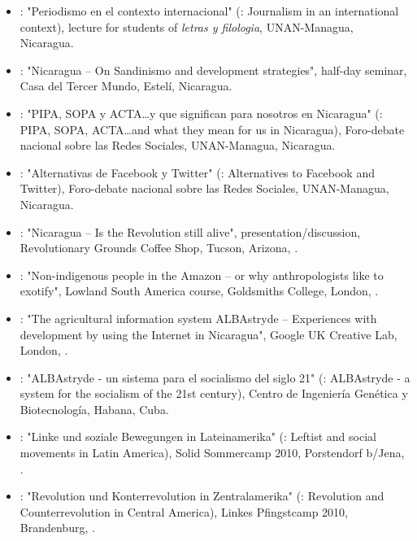 \begin{itemize}
\item {}: "Periodismo en el contexto internacional" (\english: Journalism in an international context), lecture for students of \emph{letras y filologia}, UNAN-Managua, Nicaragua.

\item {}: "Nicaragua – On Sandinismo and development strategies", half-day seminar, Casa del Tercer Mundo, Estelí, Nicaragua.

\item {}: "PIPA, SOPA y ACTA\ldots y que significan para nosotros en Nicaragua" (\english: PIPA, SOPA, ACTA\ldots and what they mean for us in Nicaragua), Foro-debate nacional sobre las Redes Sociales, UNAN-Managua, Nicaragua.

\item {}: "Alternativas de Facebook y Twitter" (\english: Alternatives to Facebook and Twitter), Foro-debate nacional sobre las Redes Sociales, UNAN-Managua, Nicaragua.

\item {}: "Nicaragua – Is the Revolution still alive", presentation/discussion, Revolutionary Grounds Coffee Shop, Tucson, Arizona, \USA.

\item {}: "Non-indigenous people in the Amazon – or why anthropologists like to exotify", Lowland South America course, Goldsmiths College, London, \UK.

\item {}: "The agricultural information system ALBAstryde – Experiences with development by using the Internet in Nicaragua", Google UK Creative Lab, London, \UK.

\item {}: "ALBAstryde - un sistema para el socialismo del siglo 21" (\english: ALBAstryde - a system for the socialism of the 21st century), Centro de Ingeniería Genética y Biotecnología, Habana, Cuba.

\item {}: "Linke und soziale Bewegungen in Lateinamerika" (\english: Leftist and social movements in Latin America), Solid Sommercamp 2010, Porstendorf b/Jena, \Germany.

\item {}: "Revolution und Konterrevolution in Zentralamerika" (\english: Revolution and Counterrevolution in Central America), Linkes Pfingstcamp 2010, Brandenburg, \Germany.


\end{itemize}
